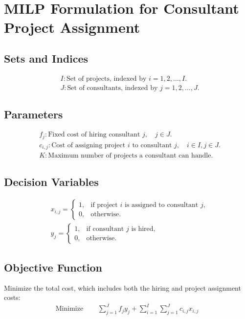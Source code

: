 \documentclass{article}
\begin{document}
\section*{MILP Formulation for Consultant Project Assignment}

\subsection*{Sets and Indices}
\begin{align*}
& I: \text{Set of projects, indexed by } i = 1, 2, \ldots, I. \\
& J: \text{Set of consultants, indexed by } j = 1, 2, \ldots, J.
\end{align*}

\subsection*{Parameters}
\begin{align*}
& f_j: \text{Fixed cost of hiring consultant } j, \quad j \in J. \\
& c_{i,j}: \text{Cost of assigning project } i \text{ to consultant } j, \quad i \in I, j \in J. \\
& K: \text{Maximum number of projects a consultant can handle.}
\end{align*}

\subsection*{Decision Variables}
\begin{align*}
& x_{i,j} = 
\begin{cases} 
1, & \text{if project } i \text{ is assigned to consultant } j, \\
0, & \text{otherwise.} 
\end{cases} \\
& y_j = 
\begin{cases} 
1, & \text{if consultant } j \text{ is hired,} \\
0, & \text{otherwise.} 
\end{cases}
\end{align*}

\subsection*{Objective Function}
Minimize the total cost, which includes both the hiring and project assignment costs:
\begin{align*}
\text{Minimize } & \quad \sum_{j=1}^{J} f_j y_j + \sum_{i=1}^{I} \sum_{j=1}^{J} c_{i,j} x_{i,j}
\end{align*}
\end{document}
